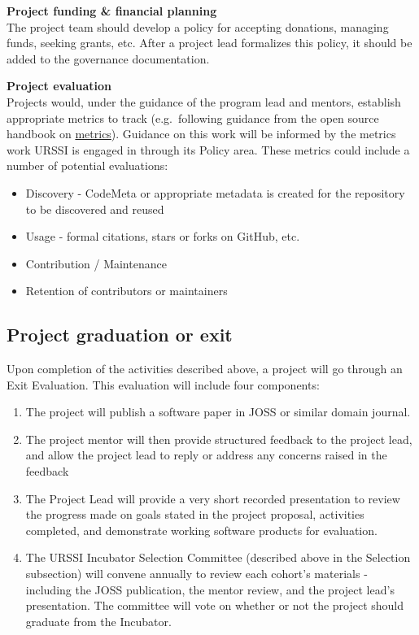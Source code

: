 \documentclass[
]{book}
\providecommand{\tightlist}{%
  \setlength{\itemsep}{0pt}\setlength{\parskip}{0pt}}
\begin{document}
\textbf{Project funding \& financial planning}\\
The project team should develop a policy for accepting donations, managing funds, seeking grants, etc. After a project lead formalizes this policy, it should be added to the governance documentation.

\textbf{Project evaluation}\\
Projects would, under the guidance of the program lead and mentors, establish appropriate metrics to track (e.g.~following guidance from the open source handbook on \href{https://opensource.guide/metrics/}{metrics}).
Guidance on this work will be informed by the metrics work URSSI is engaged in through its Policy area.
These metrics could include a number of potential evaluations:

\begin{itemize}
\tightlist
\item
  Discovery - CodeMeta or appropriate metadata is created for the repository to be discovered and reused
\item
  Usage - formal citations, stars or forks on GitHub, etc.
\item
  Contribution / Maintenance
\item
  Retention of contributors or maintainers
\end{itemize}

\hypertarget{project-graduation-or-exit}{%
\subsection{Project graduation or exit}\label{project-graduation-or-exit}}

Upon completion of the activities described above, a project will go through an Exit Evaluation. This evaluation will include four components:

\begin{enumerate}
\def\labelenumi{\arabic{enumi}.}
\tightlist
\item
  The project will publish a software paper in JOSS or similar domain journal.
\item
  The project mentor will then provide structured feedback to the project lead, and allow the project lead to reply or address any concerns raised in the feedback
\item
  The Project Lead will provide a very short recorded presentation to review the progress made on goals stated in the project proposal, activities completed, and demonstrate working software products for evaluation.\\
\item
  The URSSI Incubator Selection Committee (described above in the Selection subsection) will convene annually to review each cohort's materials - including the JOSS publication, the mentor review, and the project lead's presentation. The committee will vote on whether or not the project should graduate from the Incubator.
\end{enumerate}
\end{document}
